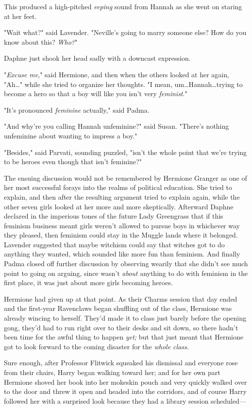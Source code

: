 This produced a high-pitched \emph{eeping} sound from Hannah as she went on
staring at her feet.

"Wait what?" said Lavender. "Neville's going to marry someone else? How do you
know about this? \emph{Who?}"

Daphne just shook her head sadly with a downcast expression.

"\emph{Excuse me}," said Hermione, and then when the others looked at her
again, "Ah…" while she tried to organize her thoughts. "I mean,
um…Hannah…trying to become a hero so that a boy will like you
isn't very \emph{feminist}."

"It's pronounced \emph{feminine} actually," said Padma.

"And why're you calling Hannah unfeminine?" said Susan. "There's nothing
unfeminine about wanting to impress a boy."

"Besides," said Parvati, sounding puzzled, "isn't the whole point that we're
trying to be heroes even though that isn't feminine?"

The ensuing discussion would not be remembered by Hermione Granger as one of
her most successful forays into the realms of political education. She tried to
explain, and then after the resulting argument tried to explain again, while
the other seven girls looked at her more and more skeptically. Afterward Daphne
declared in the imperious tones of the future Lady Greengrass that if this
feminism business meant girls weren't allowed to pursue boys in whichever way
they pleased, then feminism could stay in the Muggle lands where it belonged.
Lavender suggested that maybe witchism could say that witches got to do
anything they wanted, which sounded like more fun than feminism. And finally
Padma closed off further discussion by observing wearily that she didn't see
much point to going on arguing, since \SPHEW wasn't \emph{about} anything
to do with feminism in the first place, it was just about more girls becoming
heroes.

Hermione had given up at that point.
\later
As their Charms session that day ended and the first-year Ravenclaws began
shuffling out of the class, Hermione was already wincing to herself. They'd
made it to class just barely before the opening gong, they'd had to run right
over to their desks and sit down, so there hadn't been time for the awful thing
to happen \emph{yet;} but that just meant that Hermione got to look forward to
the coming disaster for the \emph{whole class.}

Sure enough, after Professor Flitwick squeaked his dismissal and everyone rose
from their chairs, Harry began walking toward her; and for her own part
Hermione shoved her book into her mokeskin pouch and very quickly walked over
to the door and threw it open and headed into the corridors, and of course
Harry followed her with a surprised look because they had a library session
scheduled—

